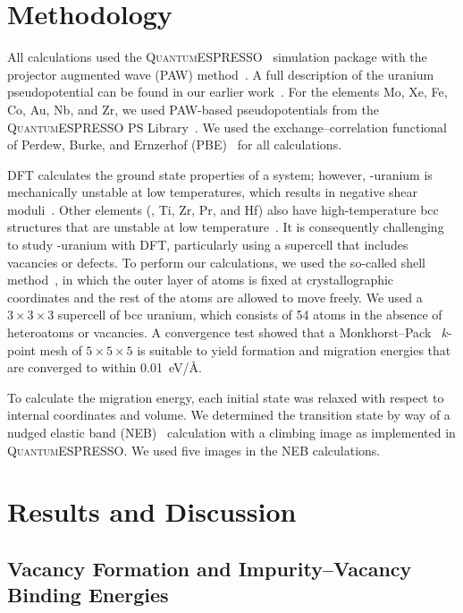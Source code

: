 \section{Methodology}\label{sec_method}

All calculations used the \textsc{QuantumESPRESSO}~\cite{giannozzi2009quantum}
simulation package with the projector augmented wave (PAW)
method~\cite{Bloechl1994}. A full description of the uranium pseudopotential
can be found in our earlier work~\cite{iasir2020pseudopotential}.
For the elements Mo, Xe, Fe, Co, Au, Nb, and Zr, we used PAW-based
pseudopotentials from the \textsc{QuantumESPRESSO}
PS Library~\cite{pp1,dal2014pseudopotentials}.
We used the exchange--correlation functional of Perdew, Burke, and Ernzerhof
(PBE)~\cite{Perdew1996b,Perdew1997} for all calculations.

DFT calculates the ground state properties of a system; however,
\mbox{\textgamma-uranium} is mechanically unstable at low temperatures,
which results in negative shear moduli~\cite{soderlind1998theory}.
Other elements (\eg, Ti, Zr, Pr, and Hf)
also have high-temperature bcc structures that are unstable at low
temperature~\cite{ye1987phonon,sanchez1975model}. 
It is consequently challenging to study \textgamma-uranium with DFT,
particularly using a supercell that includes vacancies or defects.
To perform our calculations, we used the so-called shell
method~\cite{beeler2010first}, in which the outer layer of atoms is fixed at
crystallographic coordinates and the rest of the atoms are allowed to move
freely.
We used a $3\times3\times3$ supercell of bcc uranium, which consists of 54
atoms in the absence of heteroatoms or vacancies.
A convergence test showed that a Monkhorst--Pack~\cite{monkhorst1976special} $k$-point mesh of
$5\times5\times5$ is suitable to yield formation and migration energies
that are converged to within 0.01~eV/\AA\@.

To calculate the migration energy, each initial state was relaxed with respect
to internal coordinates and volume. We determined the transition state by way
of a nudged elastic band (NEB)~\cite{henkelman2000climbing,
    henkelman2000improved}
calculation with a climbing image as implemented in \textsc{QuantumESPRESSO}. We used five images in the NEB calculations.

\section{Results and Discussion}\label{sec_result}
\subsection{Vacancy Formation and Impurity--Vacancy Binding Energies}

